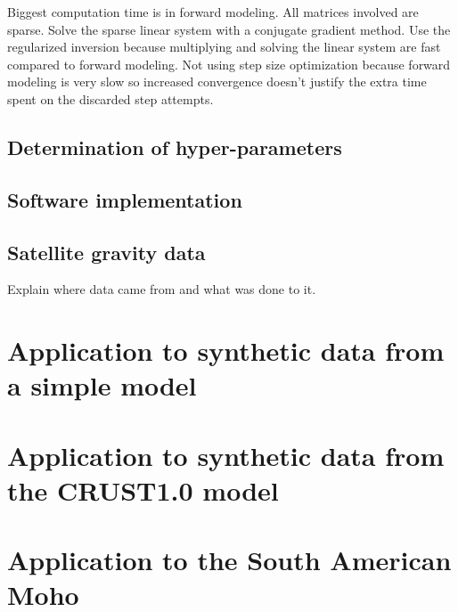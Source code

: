 \documentclass[]{article}
\begin{document}
Biggest computation time is in forward modeling.
All matrices involved are sparse.
Solve the sparse linear system with a conjugate gradient method.
Use the regularized inversion because multiplying and solving the linear system
are fast compared to forward modeling.
Not using step size optimization because forward modeling is very slow so
increased convergence doesn't justify the extra time spent on the discarded
step attempts.

\subsection{Determination of hyper-parameters}



\subsection{Software implementation}


\subsection{Satellite gravity data}


Explain where data came from and what was done to  it.


\section{Application to synthetic data from a simple model}


\section{Application to synthetic data from the CRUST1.0 model}



\section{Application to the South American Moho}
\end{document}
